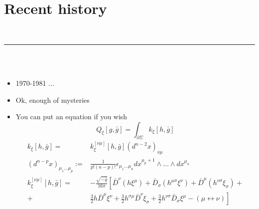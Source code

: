 \documentclass[xcolor={dvipsnames},hyperref={breaklinks=true}%
,10pt]{beamer}
\newcommand\Fontvi{\fontsize{24}{28.8}\selectfont}
\begin{document}
		\section{Recent history}
		
		\begingroup
		\begin{frame}
			\vspace{2.6 cm}
			\Huge \textcolor{white}{2.RECENT\hspace*{0.1cm} HISTORY}\vspace*{-0.3cm}
			\hspace*{-0.2cm}\textcolor{white}{\rule{1.\textwidth}{0.025cm}}
			\Large {\textcolor{white}{Department of Mysteries after \\ and during major wizarding wars}}
		\end{frame}
		\endgroup
		
		\begin{frame}
			\vspace*{-1.0cm}{\Fontvi \textcolor{red}{First Wizarding War}}\vspace*{2mm}
			\begin{itemize}
				\item 1970-1981 ...
			\end{itemize}
		\end{frame}
		
		
		\begin{frame}
			\begin{itemize}
				\item Ok, enough of mysteries
				\item You can put an equation if you wish
				\begin{equation*}
				Q_\xi[g,\bar{g}]=\int_{\partial\Sigma}k_\xi[h,\bar{g}]
				\end{equation*}
				\begin{equation*}
				\begin{split}
				k_\xi[h,\bar{g}]=&k^{[\nu\mu]}_\xi[h,\bar{g}](d^{n-2}x)_{\nu\mu}\\[2.5mm]
				(d^{n-p}x)_{\mu_1\ldots\mu_p}:=&\frac{1}{p!(n-p)!}\epsilon_{\mu_1\ldots\mu_n}dx^{\mu_p+1}\wedge\ldots\wedge dx^{\mu_n}\\[2.5mm]
				k_\xi^{[\nu\mu]}[h,\bar{g}]=&-\frac{\sqrt{-\bar{g}}}{16\pi}\left[\bar{D}^\nu(h\xi^\mu)+\bar{D}_\sigma(h^{\mu\sigma}\xi^\nu)+\bar{D}^\mu(h^{\nu\sigma}\xi_\sigma)+\right.\\[2mm]
				+&\frac{3}{2}h\bar{D}^\mu\xi^\nu+\frac{3}{2}h^{\sigma\mu}\bar{D}^\nu\xi_\sigma+\frac{3}{2}h^{\nu\sigma}\bar{D}_\sigma\xi^\mu-(\mu\leftrightarrow\nu)\left.\right]
				\end{split}
				\end{equation*}
			\end{itemize}
		\end{frame}
		
\end{document}
